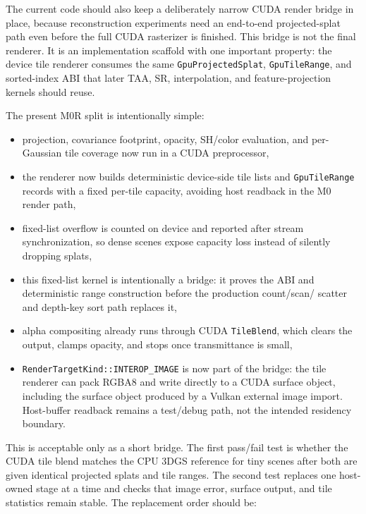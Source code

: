 \documentclass[11pt]{article}
\begin{document}
The current code should also keep a deliberately narrow CUDA render bridge in
place, because reconstruction experiments need an end-to-end projected-splat
path even before the full CUDA rasterizer is finished. This bridge is not the
final renderer. It is an implementation scaffold with one important property:
the device tile renderer consumes the same \texttt{GpuProjectedSplat},
\texttt{GpuTileRange}, and sorted-index ABI that later TAA, SR, interpolation,
and feature-projection kernels should reuse.

The present M0R split is intentionally simple:

\begin{itemize}
  \item projection, covariance footprint, opacity, SH/color evaluation, and
        per-Gaussian tile coverage now run in a CUDA preprocessor,
  \item the renderer now builds deterministic device-side tile lists and
        \texttt{GpuTileRange} records with a fixed per-tile capacity, avoiding
        host readback in the M0 render path,
  \item fixed-list overflow is counted on device and reported after stream
        synchronization, so dense scenes expose capacity loss instead of
        silently dropping splats,
  \item this fixed-list kernel is intentionally a bridge: it proves the ABI and
        deterministic range construction before the production count/scan/
        scatter and depth-key sort path replaces it,
  \item alpha compositing already runs through CUDA \texttt{TileBlend}, which
        clears the output, clamps opacity, and stops once transmittance is
        small,
  \item \texttt{RenderTargetKind::INTEROP\_IMAGE} is now part of the bridge:
        the tile renderer can pack RGBA8 and write directly to a CUDA surface
        object, including the surface object produced by a Vulkan external
        image import. Host-buffer readback remains a test/debug path, not the
        intended residency boundary.
\end{itemize}

This is acceptable only as a short bridge. The first pass/fail test is whether
the CUDA tile blend matches the CPU 3DGS reference for tiny scenes after both
are given identical projected splats and tile ranges. The second test replaces
one host-owned stage at a time and checks that image error, surface output, and
tile statistics remain stable. The replacement order should be:
\end{document}
